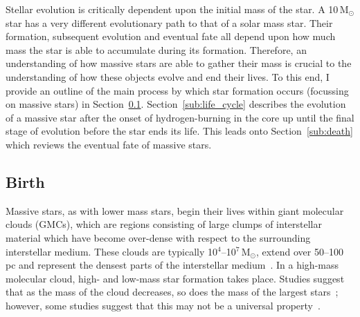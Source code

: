 Stellar evolution is critically dependent upon the initial mass of the star.
A 10\,M$_{\odot}$ star has a very different evolutionary path to that of a solar mass star.
Their formation, subsequent evolution and eventual fate all depend upon how much mass the star is able to accumulate during its formation.
Therefore, an understanding of how massive stars are able to gather their mass is crucial to the understanding of how these objects evolve and end their lives.
To this end, I provide an outline of the main process by which star formation occurs (focussing on massive stars) in Section~\ref{sub:birth}. Section~\ref{sub:life_cycle} describes the evolution of a massive star after the onset of hydrogen-burning in the core up until the final stage of evolution before the star ends its life.
This leads onto Section~\ref{sub:death} which reviews the eventual fate of massive stars.

\subsection{Birth} %
\label{sub:birth}

Massive stars, as with lower mass stars, begin their lives within giant molecular clouds (GMCs), which are regions consisting of large clumps of interstellar material which have become over-dense with respect to the surrounding interstellar medium.
These clouds are typically 10$^{4}$--10$^{7}$\,M$_{\odot}$, extend over 50--100\,pc and represent the densest parts of the interstellar medium~\citep{Fukui10}.
In a high-mass molecular cloud, high- and low-mass star formation takes place.
Studies suggest that as the mass of the cloud decreases, so does the mass of the largest stars~\citep{Fukui10,Weidner10}; however, some studies suggest that this may not be a universal property~\citep[e.g.][]{Bressert12}.

